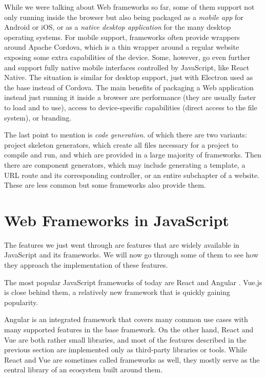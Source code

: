 \documentclass[english,odsaz]{fitthesis}
\begin{document}
While we were talking about Web frameworks so far, some of them support not only
running inside the browser but also being packaged as a \emph{mobile app} for Android
or iOS, or as a \emph{native desktop application} for the many desktop operating
systems. For mobile support, frameworks often provide wrappers around Apache
Cordova, which is a thin wrapper around a regular website exposing some extra
capabilities of the device. Some, however, go even further and support fully
native mobile interfaces controlled by JavaScript, like React Native. The
situation is similar for desktop support, just with Electron used as the base
instead of Cordova. The main benefits of packaging a Web application instead
just running it inside a browser are performance (they are usually faster to
load and to use), access to device-specific capabilities (direct access to the
file system), or branding.

The last point to mention is \emph{code generation}. of which there are two variants:
project skeleton generators, which create all files necessary for a project to
compile and run, and which are provided in a large majority of frameworks. Then
there are component generators, which may include generating a template, a URL
route and its corresponding controller, or an entire subchapter of a
website. These are less common but some frameworks also provide them.

\section{Web Frameworks in JavaScript}
\label{sec:org2a19298}
The features we just went through are features that are widely available in
JavaScript and its frameworks. We will now go through some of them to see how
they approach the implementation of these features.

The most popular JavaScript frameworks of today are React and Angular
\cite{frontend-cmp}. Vue.js is close behind them, a relatively new framework that
is quickly gaining popularity.

Angular is an integrated framework that covers many common use cases with many
supported features in the base framework. On the other hand, React and Vue are
both rather small libraries, and most of the features described in the previous
section are implemented only as third-party libraries or tools. While React and
Vue are sometimes called frameworks as well, they mostly serve as the central
library of an ecosystem built around them.
\end{document}
